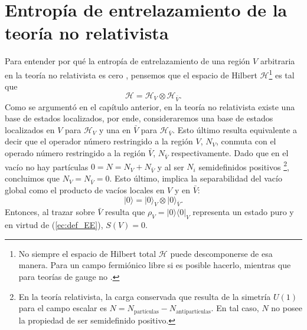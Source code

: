 \section{Entropía de entrelazamiento de la teoría no relativista}
Para entender por qué la entropía de entrelazamiento de una región $V$ arbitraria en la teoría no relativista es cero \cite{Hason:2017flq}, pensemos que el espacio de Hilbert $\mathcal{H}$\footnote{No siempre el espacio de Hilbert total $\mathcal{H}$ puede descomponerse de esa manera. Para un campo fermiónico libre si es posible hacerlo, mientras que para teorías de gauge no \cite{Casini:2013rba}.} es tal que
\begin{equation}
\mathcal{H}=\mathcal{H}_V \otimes \mathcal{H}_{\bar{V}}.
\end{equation}
Como se argumentó en el capítulo anterior, en la teoría no relativista existe una base de estados localizados, por ende, consideraremos una base de estados localizados en $V$ para $\mathcal{H}_V$ y una en $\bar{V}$ para $\mathcal{H}_{\bar{V}}$. Esto último resulta equivalente a decir que el operador número restringido a la región $V$, $N_V$, conmuta con el operado número restringido a la región $\bar{V}$, $N_{\bar{V}}$ respectivamente. Dado que en el vacío no hay partículas $0=N=N_V+N_{\bar{V}}$ y al ser $N_i$ semidefinidos positivos \footnote{En la teoría relativista, la carga conservada que resulta de la simetría $U(1)$ para el campo escalar es $N=N_{\text{partículas}}-N_{\text{antipartículas}}$. En tal caso, $N$ no posee la propiedad de ser semidefinido positivo.}, concluimos que $N_V=N_{\bar{V}}=0$. Esto último, implica la separabilidad del vacío global como el producto de vacíos locales en $V$ y en $\bar{V}$:
\begin{equation}
|0\rangle = |0\rangle _{V} \otimes |0\rangle_{\bar{V}}.
\end{equation}
Entonces, al trazar sobre $\bar{V}$ resulta que $\rho_V=|0 \rangle \langle 0|_V $ representa un estado puro y en virtud de (\ref{ec:def_EE}), $S(V)=0$.
